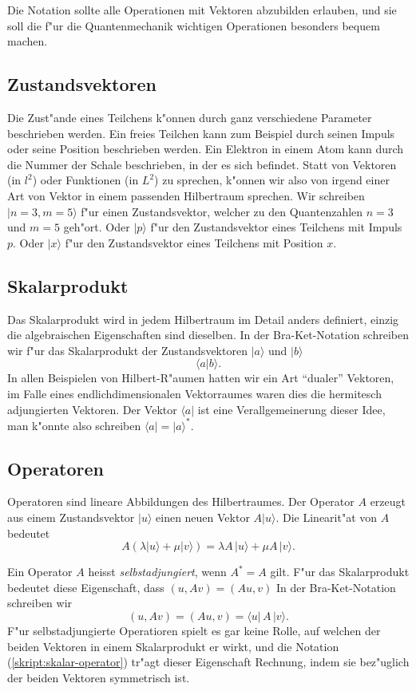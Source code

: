 Die Notation sollte alle Operationen mit Vektoren abzubilden erlauben,
und sie soll die f"ur die Quantenmechanik wichtigen Operationen besonders
bequem machen.

\subsection{Zustandsvektoren}
Die Zust"ande eines Teilchens k"onnen durch ganz verschiedene Parameter
beschrieben werden. Ein freies Teilchen kann zum Beispiel durch seinen
Impuls oder seine Position beschrieben werden. Ein Elektron in einem
Atom kann durch die Nummer der Schale beschrieben, in der es sich befindet. 
Statt von Vektoren (in $l^2$) oder Funktionen (in $L^2$) zu sprechen, k"onnen
wir also von irgend einer Art von Vektor in einem passenden Hilbertraum 
sprechen. Wir schreiben 
$|n=3,m=5\rangle$ f"ur einen Zustandsvektor, welcher zu den Quantenzahlen $n=3$ und $m=5$ geh"ort. Oder $|p\rangle$ f"ur den Zustandsvektor eines Teilchens
mit Impuls $p$. Oder $|x\rangle$ f"ur den Zustandsvektor eines Teilchens
mit Position $x$.

\subsection{Skalarprodukt}
Das Skalarprodukt wird in jedem Hilbertraum im Detail anders definiert,
einzig die algebraischen Eigenschaften sind dieselben. In der Bra-Ket-Notation
schreiben wir  f"ur das Skalarprodukt der Zustandsvektoren 
$|a\rangle$ und $|b\rangle$
\[
\langle a|b\rangle.
\]
In allen Beispielen von Hilbert-R"aumen hatten wir ein Art ``dualer''
Vektoren, im Falle eines endlichdimensionalen Vektorraumes waren dies
die hermitesch adjungierten Vektoren. Der Vektor $\langle a|$ ist eine
Verallgemeinerung dieser Idee, man k"onnte also schreiben
$\langle a|=|a\rangle^*$.

\subsection{Operatoren}
Operatoren sind lineare Abbildungen des Hilbertraumes. Der Operator $A$
erzeugt aus einem Zustandsvektor $|u\rangle$ einen neuen Vektor
$A|u\rangle$. Die Linearit"at von $A$ bedeutet
\[
A(\lambda |u\rangle + \mu |v\rangle)=\lambda A \,|u\rangle + \mu A\,|v\rangle.
\]

Ein Operator $A$ heisst {\em selbstadjungiert}, wenn $A^*=A$ gilt.
%
F"ur das Skalarprodukt bedeutet diese Eigenschaft, dass $(u, Av)=(Au,v)$ 
In der Bra-Ket-Notation schreiben wir 
\begin{equation}
(u,Av)=(Au,v)=\langle u|\,A\,|v\rangle.
\label{skript:skalar-operator}
\end{equation}
F"ur selbstadjungierte Operatioren spielt es gar keine Rolle, auf welchen
der beiden Vektoren in einem Skalarprodukt er wirkt, und die Notation
(\ref{skript:skalar-operator}) tr"agt dieser Eigenschaft Rechnung, indem sie
bez"uglich der beiden Vektoren symmetrisch ist.

